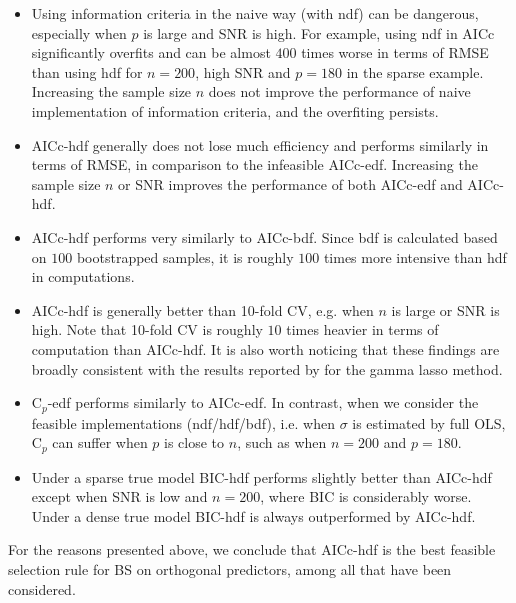 \begin{itemize}
	\item Using information criteria in the naive way (with ndf) can be dangerous, especially when $p$ is large and SNR is high. For example, using ndf in AICc significantly overfits and can be almost $400$ times worse in terms of RMSE than using hdf for $n=200$, high SNR and $p=180$ in the sparse example. Increasing the sample size $n$ does not improve the performance of naive implementation of information criteria, and the overfiting persists.
	\item AICc-hdf generally does not lose much efficiency and performs similarly in terms of RMSE, in comparison to the infeasible AICc-edf. Increasing the sample size $n$ or SNR improves the performance of both AICc-edf and AICc-hdf. 
	\item AICc-hdf performs very similarly to AICc-bdf. Since bdf is calculated based on $100$ bootstrapped samples, it is roughly $100$ times more intensive than hdf in computations. 
	\item AICc-hdf is generally better than 10-fold CV, e.g. when $n$ is large or SNR is high. Note that 10-fold CV is roughly $10$ times heavier in terms of computation than AICc-hdf. It is also worth noticing that these findings are broadly consistent with the results reported by \citet{Taddy2017} for the gamma lasso method. 
	\item C$_p$-edf performs similarly to AICc-edf. In contrast, when we consider the feasible implementations (ndf/hdf/bdf), i.e. when $\sigma$ is estimated by full OLS, C$_p$ can suffer when $p$ is close to $n$, such as when $n=200$ and $p=180$. 
	\item Under a sparse true model BIC-hdf performs slightly better than AICc-hdf except when SNR is low and $n=200$, where BIC is considerably worse. Under a dense true model BIC-hdf is always outperformed by AICc-hdf. 
\end{itemize}
For the reasons presented above, we conclude that AICc-hdf is the best feasible selection rule for BS on orthogonal predictors, among all that have been considered. 




%